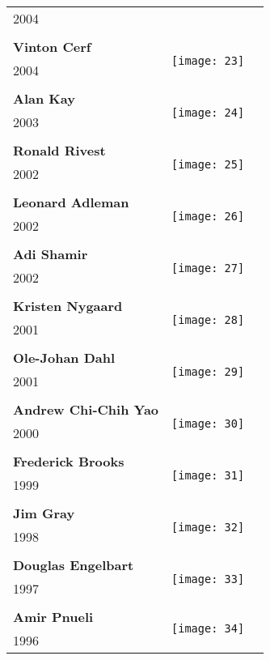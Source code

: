 \documentclass[12pt]{article}
\begin{document}
\begin{center}
\begin{longtable}{| p{} | p{} | p{20cm}}
2004&   \\ 
&\\
\hline
\textbf{Vinton Cerf}  &  \multirow{3}{4em}{\texttt{[image: 23]}} \\ 
2004&   \\ 
&\\
\hline
\textbf{Alan Kay}  &  \multirow{3}{4em}{\texttt{[image: 24]}} \\ 
2003&   \\ 
&\\
\hline
\textbf{Ronald Rivest}  &  \multirow{3}{4em}{\texttt{[image: 25]}} \\ 
2002&   \\ 
&\\
\hline
\textbf{Leonard Adleman}  &  \multirow{3}{4em}{\texttt{[image: 26]}} \\ 
2002&   \\ 
&\\
\hline
\textbf{Adi Shamir}  &  \multirow{3}{4em}{\texttt{[image: 27]}} \\ 
2002&   \\
&\\
\hline
\textbf{Kristen Nygaard } &  \multirow{3}{4em}{\texttt{[image: 28]}} \\ 
2001&   \\ 
&\\
\hline
\textbf{Ole-Johan Dahl}  &  \multirow{3}{4em}{\texttt{[image: 29]}} \\ 
2001&   \\ 
&\\
\hline
\textbf{Andrew Chi-Chih Yao}  &  \multirow{3}{4em}{\texttt{[image: 30]}} \\ 
2000&   \\ 
&\\
\hline
\textbf{Frederick Brooks } &  \multirow{3}{4em}{\texttt{[image: 31]}} \\ 
1999&   \\
&\\
\hline
\textbf{Jim Gray}  &  \multirow{3}{4em}{\texttt{[image: 32]}} \\ 
1998&   \\ 
&\\
\hline
\textbf{Douglas Engelbart}  &  \multirow{3}{4em}{\texttt{[image: 33]}} \\ 
1997&   \\ 
&\\
\hline
\textbf{Amir Pnueli } &  \multirow{3}{4em}{\texttt{[image: 34]}} \\ 
1996&   \\ 

\end{longtable}
\end{center}
\end{document}
